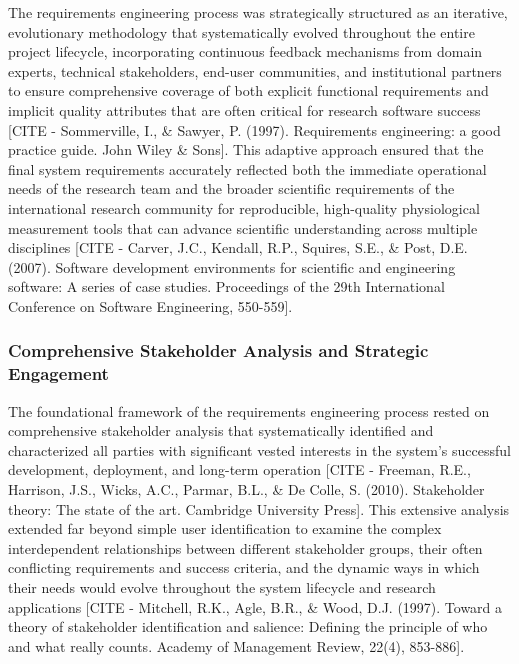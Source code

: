 \documentclass[11pt,a4paper]{report}
\begin{document}
The requirements engineering process was strategically structured as an iterative, evolutionary methodology that
systematically evolved throughout the entire project lifecycle, incorporating continuous feedback mechanisms from domain
experts, technical stakeholders, end-user communities, and institutional partners to ensure comprehensive coverage of
both explicit functional requirements and implicit quality attributes that are often critical for research software
success [CITE - Sommerville, I., \& Sawyer, P. (1997). Requirements engineering: a good practice guide. John Wiley \& Sons].
This adaptive approach ensured that the final system requirements accurately reflected both the immediate operational
needs of the research team and the broader scientific requirements of the international research community for
reproducible, high-quality physiological measurement tools that can advance scientific understanding across multiple
disciplines [CITE - Carver, J.C., Kendall, R.P., Squires, S.E., \& Post, D.E. (2007). Software development environments for scientific and engineering software: A series of case studies. Proceedings of the 29th International Conference on Software Engineering, 550-559].

\subsubsection{Comprehensive Stakeholder Analysis and Strategic Engagement}

The foundational framework of the requirements engineering process rested on comprehensive stakeholder analysis that
systematically identified and characterized all parties with significant vested interests in the system's successful
development, deployment, and long-term
operation [CITE - Freeman, R.E., Harrison, J.S., Wicks, A.C., Parmar, B.L., \& De Colle, S. (2010). Stakeholder theory: The state of the art. Cambridge University Press].
This extensive analysis extended far beyond simple user identification to examine the complex interdependent
relationships between different stakeholder groups, their often conflicting requirements and success criteria, and the
dynamic ways in which their needs would evolve throughout the system lifecycle and research
applications [CITE - Mitchell, R.K., Agle, B.R., \& Wood, D.J. (1997). Toward a theory of stakeholder identification and salience: Defining the principle of who and what really counts. Academy of Management Review, 22(4), 853-886].
\end{document}
